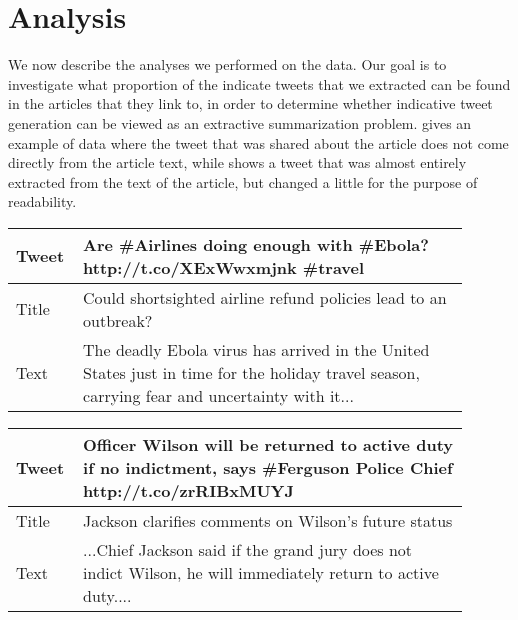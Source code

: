 \section{Analysis}
\label{sec:analysis}

We now describe the analyses we performed on the data. Our goal is to investigate what proportion of the indicate tweets that we extracted can be found in the articles that they link to, in order to determine whether indicative tweet generation can be viewed as an extractive summarization problem.  gives an example of data where the tweet that was shared about the article does not come directly from the article text, while  shows a tweet that was almost entirely extracted from the text of the article, but changed a little for the purpose of readability.

\begin{table}[htbp]
\centering
\begin{tabular}{|p{0.1\linewidth}|p{0.8\linewidth}|}
\hline
Tweet &  Are \#Airlines doing enough with \#Ebola? http://t.co/XExWwxmjnk \#travel \\ \hline
Title &  Could shortsighted airline refund policies lead to an outbreak? \\  \hline
Text  &  The deadly Ebola virus has arrived in the United States just in time for the holiday travel season, carrying fear and uncertainty with it... \\ \hline
\end{tabular}
\label{tab:noextract}
\end{table}

\begin{table}[htbp]
\centering
\begin{tabular}{|p{0.1\linewidth}|p{0.8\linewidth}|}
\hline
Tweet & Officer Wilson will be returned to active duty if no indictment, says \#Ferguson Police Chief http://t.co/zrRIBxMUYJ  \\ \hline
Title & Jackson clarifies comments on Wilson's future status \\ \hline
Text  & ...Chief Jackson said if the grand jury does not indict Wilson, he will immediately return to active duty.... \\ \hline
\end{tabular}
\label{tab:extract}
\end{table}

